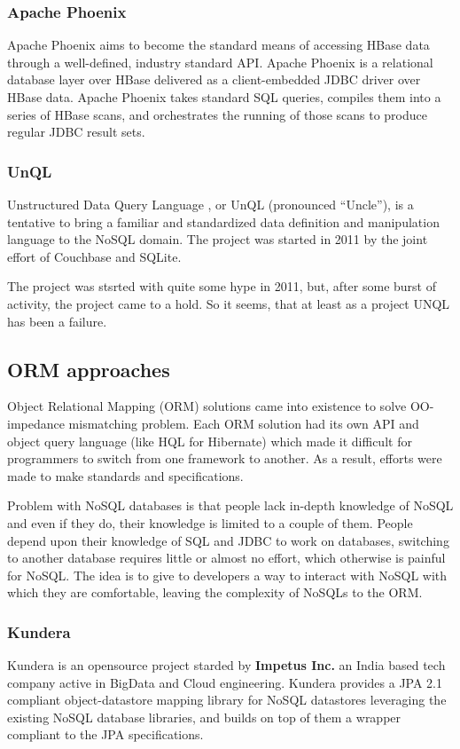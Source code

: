 \subsubsection{Apache Phoenix} 
Apache Phoenix \cite{online:apache-phoenix} aims to become the standard means of accessing HBase data through a well-defined, industry standard API.
Apache Phoenix is a relational database layer over HBase delivered as a client-embedded JDBC driver over HBase data. Apache Phoenix takes standard SQL queries, compiles them into a series of HBase scans, and orchestrates the running of those scans to produce regular JDBC result sets. 

\subsubsection{UnQL}  
Unstructured Data Query Language \cite{online:unql}, or UnQL (pronounced “Uncle”), is a tentative to bring a familiar and standardized data definition and manipulation language to the NoSQL domain. The project was started in 2011 by the joint effort of Couchbase and SQLite.

\noindent The project was stsrted with quite some hype in 2011, but, after some burst of activity, the project came to a hold. So it seems, that at least as a project UNQL has been a failure. 

\subsection{ORM approaches}
Object Relational Mapping (ORM) solutions came into existence to solve OO-impedance mismatching problem. Each ORM solution had its own API and object query language (like HQL for Hibernate) which made it difficult for programmers to switch from one framework to another. As a result, efforts were made to make standards and specifications. 

\noindent Problem with NoSQL databases is that people lack in-depth knowledge of NoSQL and even if they do, their knowledge is limited to a couple of them. People depend upon their knowledge of SQL and JDBC to work on databases, switching to another database requires little or almost no effort, which otherwise is painful for NoSQL.
The idea is to give to developers a way to interact with NoSQL with which they are comfortable, leaving the complexity of NoSQLs to the ORM.

\subsubsection{Kundera}
Kundera is an opensource project starded by \textbf{Impetus Inc.} an India based tech company active in BigData and Cloud engineering.
Kundera provides a JPA 2.1 compliant object-datastore mapping library for NoSQL datastores leveraging the existing NoSQL database libraries, and builds on top of them a wrapper compliant to the JPA specifications.


